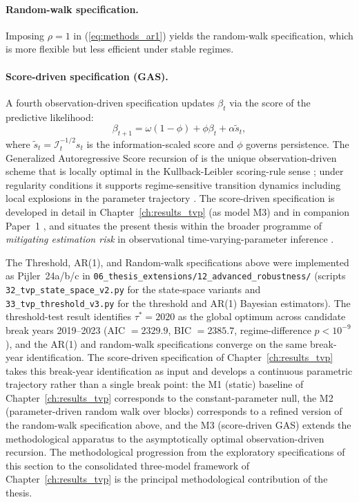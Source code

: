 \paragraph{Random-walk specification.} Imposing $\rho = 1$ in (\ref{eq:methods_ar1}) yields the random-walk specification, which is more flexible but less efficient under stable regimes.

\paragraph{Score-driven specification (GAS).} A fourth observation-driven specification updates $\beta_t$ via the score of the predictive likelihood:
\begin{equation}
\beta_{t+1} = \omega(1-\phi) + \phi \beta_t + \alpha \tilde{s}_t,
\label{eq:methods_gas}
\end{equation}
where $\tilde{s}_t = \mathcal{I}_t^{-1/2} s_t$ is the information-scaled score and $\phi$ governs persistence. The Generalized Autoregressive Score recursion of \cite{creal2013generalized} is the unique observation-driven scheme that is locally optimal in the Kullback-Leibler scoring-rule sense \cite{blasques2015robust}; under regularity conditions it supports regime-sensitive transition dynamics including local explosions in the parameter trajectory \cite{blasques2022local}. The score-driven specification is developed in detail in Chapter~\ref{ch:results_tvp} (as model M3) and in companion Paper~1 \cite{saakstra2026paper1}, and situates the present thesis within the broader programme of \emph{mitigating estimation risk} in observational time-varying-parameter inference \cite{blasques2024mitigating}.

The Threshold, AR(1), and Random-walk specifications above were implemented as Pijler~24a/b/c in \texttt{06\_thesis\_extensions/12\_advanced\_robustness/} (scripts \texttt{32\_tvp\_state\_space\_v2.py} for the state-space variants and \texttt{33\_tvp\_threshold\_v3.py} for the threshold and AR(1) Bayesian estimators). The threshold-test result identifies $\tau^* = 2020$ as the global optimum across candidate break years 2019--2023 (AIC $= 2329.9$, BIC $= 2385.7$, regime-difference $p < 10^{-9}$), and the AR(1) and random-walk specifications converge on the same break-year identification. The score-driven specification of Chapter~\ref{ch:results_tvp} takes this break-year identification as input and develops a continuous parametric trajectory rather than a single break point: the M1 (static) baseline of Chapter~\ref{ch:results_tvp} corresponds to the constant-parameter null, the M2 (parameter-driven random walk over blocks) corresponds to a refined version of the random-walk specification above, and the M3 (score-driven GAS) extends the methodological apparatus to the asymptotically optimal observation-driven recursion. The methodological progression from the exploratory specifications of this section to the consolidated three-model framework of Chapter~\ref{ch:results_tvp} is the principal methodological contribution of the thesis.

